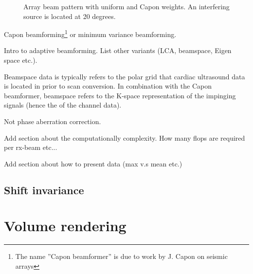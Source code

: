 \begin{figure}[t!]
\caption{Array beam pattern with uniform and Capon weights. An interfering source is located at 20 degrees.}
\end{figure}

Capon beamforming\footnote{The name ''Capon beamformer'' is due to work by J. Capon  on seismic arrays } or minimum variance beamforming.

Intro to adaptive beamforming. List other variants (LCA, beamspace, Eigen space etc.). 

Beamspace data is typically refers to the polar grid that cardiac ultrasound data is located in prior to scan conversion. In combination with the Capon beamformer, beamspace refers to the K-space representation of the impinging signals (hence the  of the channel data). 

Not phase aberration correction.

Add section about the computationally complexity. How many flops are required per rx-beam etc...

Add section about how to present data (max v.s mean etc.)
						
\subsection{Shift invariance}

\section{Volume rendering}


